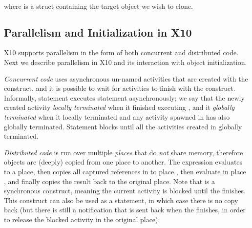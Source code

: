 ~~~~~~~~\\
where  is a struct containing the target object we wish to clone.




\subsection{Parallelism and Initialization in X10}
\label{Section:Parallelism}
X10 supports parallelism in the form of both concurrent and distributed code.
Next we describe parallelism in X10 and its interaction with object initialization.

\emph{Concurrent code} uses asynchronous un-named activities that are created with the  construct,
    and it is possible to wait for activities to finish with the  construct.
Informally, statement  executes statement  asynchronously;
    we say that the newly created activity \emph{locally terminated} when it finished executing ,
        and it \emph{globally terminated} when it locally terminated and any activity spawned in 
            has also globally terminated.
Statement  blocks until all the activities created in  globally terminated.

\emph{Distributed code} is run over multiple \emph{places} that do \emph{not} share memory,
    therefore objects are (deeply) copied from one place to another.
The expression  evaluates  to a place, then copies all captured references in  to place ,
    then evaluate  in place , and finally copies the result back to the original place.
Note that  is a synchronous construct, meaning the current activity is blocked until the  finishes.
This construct can also be used as a statement, in which case there is no copy back
    (but there is still a notification that is sent back when the  finishes, in order to release the blocked activity in the original place).




